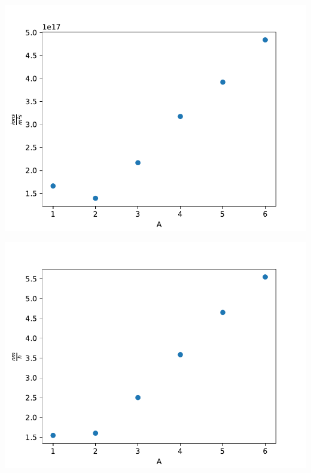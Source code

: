 \documentclass{beamer} %
\begin{document}
\begin{frame}
\begin{minipage}{0.49\textwidth}
        \includegraphics[width=1.1\textwidth]{figures/CurrentVary_H2_100sccm_flux.pdf}
    \end{minipage}
    \begin{minipage}{0.49\textwidth}
        \includegraphics[width=1.1\textwidth]{figures/CurrentVary_H2_100sccm_worstcasesput.pdf}
    \end{minipage}
\end{frame}
\end{document}
